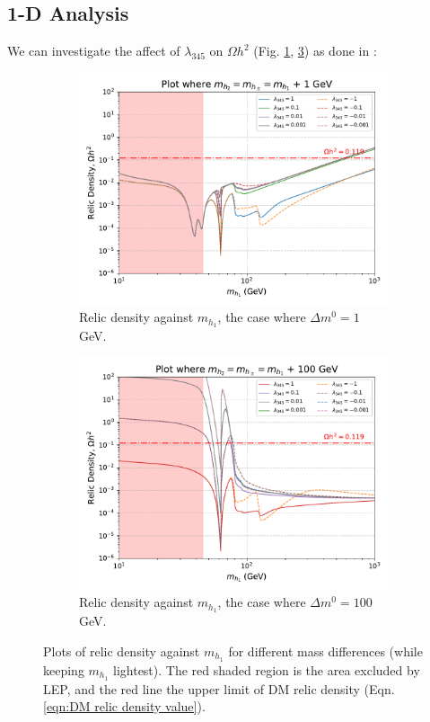 \documentclass[12pt]{article}
\begin{document}
\subsection{1-D Analysis}
\label{1-D scan}
We can investigate the affect of $\lambda_{345}$ on $\Omega h^2$ (Fig. \ref{fig:MD1_l345_1}, \ref{fig:MD1_l345_100}) as done in \cite{Belyaev:2016lok}:
\begin{figure}[ht]
    \centering
    \begin{subfigure}[b]{0.49\textwidth}
        \centering
        \includegraphics[width=\textwidth]{plots/plot_MD1_l345+1.pdf}
        \caption{Relic density against $m_{h_1}$, the case where $\Delta m^0 = 1$ GeV.}
        \label{fig:MD1_l345_1}
    \end{subfigure}
    \hfill
    \begin{subfigure}[b]{0.49\textwidth}
        \centering
        \includegraphics[width=\textwidth]{plots/plot_MD1_l345+100.pdf}
        \caption{Relic density against $m_{h_1}$, the case where $\Delta m^0 = 100$ GeV.}
        \label{fig:MD1_l345_100}
    \end{subfigure}
    \caption{Plots of relic density against $m_{h_1}$ for different mass differences (while keeping $m_{h_1}$ lightest). The red shaded region is the area excluded by LEP, and the red line the upper limit of DM relic density (Eqn. \ref{eqn:DM relic density value}).}
\end{figure}
\end{document}
